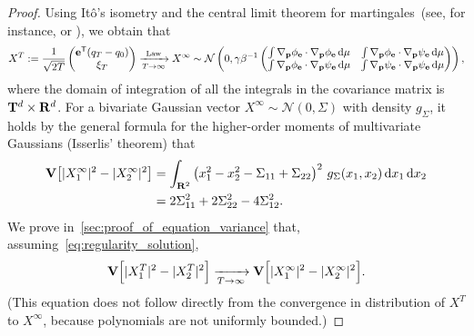 \documentclass[11pt,a4paper]{article}
\begin{document}
\begin{proof}
    Using It\^o's isometry and the central limit theorem for martingales~(see, for instance, \cite{MR668684} or \cite[Theorem 3.3]{pavliotis2008multiscale}),
    we obtain that
    \[
        X^T :=
        \frac{1}{\sqrt{2T}}
        \begin{pmatrix}
            \boldsymbol{\mathbf e}^\mathsf T (q_T - q_0) \\
            \xi_T
        \end{pmatrix}
        \xrightarrow[T \to \infty]{\rm Law}
        X^{\infty} \sim
        \mathcal N \left(0,
            \gamma \beta^{-1}
            \begin{pmatrix}
                \int \nabla_{\boldsymbol{\mathbf p}} \phi_{\boldsymbol{\mathbf e}} \cdot \nabla_{\boldsymbol{\mathbf p}} \phi_{\boldsymbol{\mathbf e}} \, \mathrm d \mu & \int \nabla_{\boldsymbol{\mathbf p}} \phi_{\boldsymbol{\mathbf e}} \cdot \nabla_{\boldsymbol{\mathbf p}} \psi_{\boldsymbol{\mathbf e}} \, \mathrm d \mu \\
                \int \nabla_{\boldsymbol{\mathbf p}} \phi_{\boldsymbol{\mathbf e}} \cdot \nabla_{\boldsymbol{\mathbf p}} \psi_{\boldsymbol{\mathbf e}} \, \mathrm d \mu & \int \nabla_{\boldsymbol{\mathbf p}} \psi_{\boldsymbol{\mathbf e}} \cdot \nabla_{\boldsymbol{\mathbf p}} \psi_{\boldsymbol{\mathbf e}} \, \mathrm d \mu
            \end{pmatrix}
        \right),
    \]
    where the domain of integration of all the integrals in the covariance matrix is $\mathbf T^d \times \mathbf R^d$.
    For a bivariate Gaussian vector $X^{\infty} \sim \mathcal N(0, \Sigma)$ with density $g_{\Sigma}$,
    it holds by the general formula for the higher-order moments of multivariate Gaussians (Isserlis' theorem)
    that
    \begin{align}
        \notag
        \mathbf{V} \bigl[ \lvert X^{\infty}_1 \rvert^2 - \lvert X^{\infty}_2 \rvert^2\bigr]
        &= \int_{\mathbf R^2} \left( x_1^2 - x_2^2 - \Sigma_{11} + \Sigma_{22} \right)^2 \, g_{\Sigma}(x_1, x_2) \, \mathrm d x_1 \, \mathrm d x_2 \\
        \label{eq:intermediate_identity}
        &= 2 \Sigma_{11}^2 + 2 \Sigma_{22}^2 - 4 \Sigma_{12}^2.
    \end{align}
    We prove in~\cref{sec:proof_of_equation_variance} that,
    assuming~\eqref{eq:regularity_solution},
    \begin{equation}
        \label{eq:limit_variance}
        \mathbf{V} \Bigl[ \lvert X^T_1 \rvert^2 - \lvert X^T_2 \rvert^2 \Bigr]
        \xrightarrow[T \to \infty]{}
        \mathbf{V} \Bigl[ \lvert X^{\infty}_1 \rvert^2 - \lvert X^{\infty}_2 \rvert^2 \Bigr].
    \end{equation}
    (This equation does not follow directly from the convergence in distribution of $X^T$ to $X^{\infty}$,
    because polynomials are not uniformly bounded.)

\end{proof}
\end{document}
